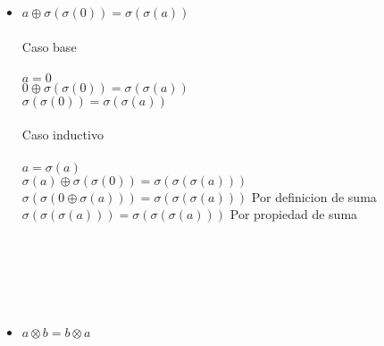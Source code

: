 \documentclass{article}
\begin{document}
\begin{itemize}
        \item{$a\oplus \sigma(\sigma(0))=\sigma(\sigma(a))$}\\
        \\
        Caso base\\
        \\
        {$a = 0 $}\\
        {$0\oplus \sigma(\sigma(0))=\sigma(\sigma(a))$}\\
        {$\sigma(\sigma(0))=\sigma(\sigma(a))$}\\
        \\
        Caso inductivo\\
        \\
        {$a = \sigma(a) $}\\
        {$\sigma(a)\oplus \sigma(\sigma(0))=\sigma(\sigma(\sigma(a)))$}\\
        {$ \sigma(\sigma(0 \oplus \sigma(a)))=\sigma(\sigma(\sigma(a)))$} Por definicion de suma\\
        {$ \sigma(\sigma(\sigma(a)))=\sigma(\sigma(\sigma(a)))$} Por propiedad de suma\\
        \\
        \\
        \\
        \\
        \\
   
     

        \item{$a \otimes b = b \otimes a$}\\
        \\
    

\end{itemize}
\end{document}
